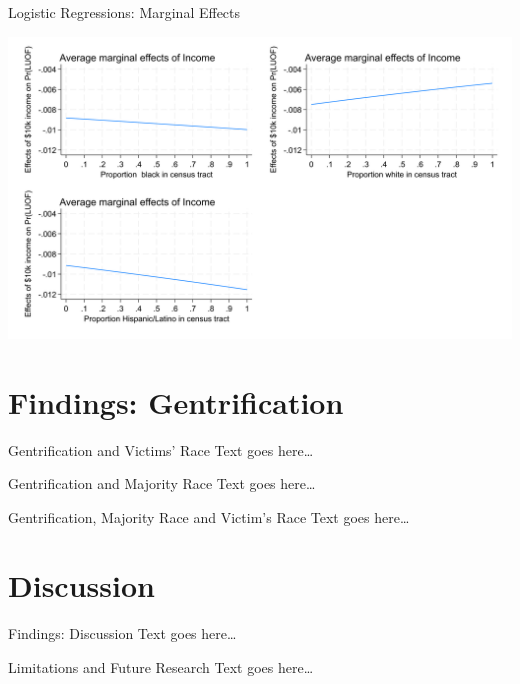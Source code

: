 \documentclass{beamer}
\begin{document}
\begin{frame}{Logistic Regressions: Marginal Effects}
	\begin{center}
		\includegraphics[height=0.85\textheight]{images/LUOF_logit_combined_effects}
	\end{center}
\end{frame}

\section{Findings: Gentrification}
\begin{frame}{Gentrification and Victims’ Race}
	Text goes here\ldots
\end{frame}

\begin{frame}{Gentrification and Majority Race}
	Text goes here\ldots
\end{frame}

\begin{frame}{Gentrification, Majority Race and Victim’s Race}
	Text goes here\ldots
\end{frame}

\section{Discussion}
\begin{frame}{Findings: Discussion}
	Text goes here\ldots
\end{frame}

\begin{frame}{Limitations and Future Research}
	Text goes here\ldots
\end{frame}
\end{document}
